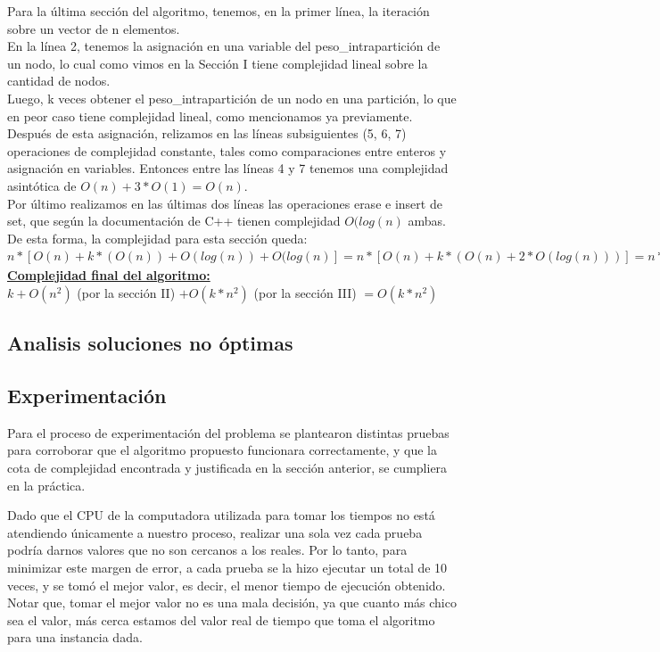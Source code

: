 \documentclass[10pt,a4paper]{article}
\begin{document}
Para la última sección del algoritmo, tenemos, en la primer línea, la iteración sobre un vector de n elementos.\\
En la línea 2, tenemos la asignación en una variable del peso\_intrapartición de un nodo, lo cual como vimos en la Sección I tiene complejidad lineal sobre la cantidad de nodos.\\
Luego, k veces obtener el peso\_intrapartición de un nodo en una partición, lo que en peor caso tiene complejidad lineal, como mencionamos ya previamente. Después de esta asignación, relizamos en las líneas subsiguientes (5, 6, 7) operaciones de complejidad constante, tales como comparaciones entre enteros y asignación en variables. Entonces entre las líneas 4 y 7 tenemos una complejidad asintótica de $O(n) + 3*O(1) = O(n)$.\\
Por último realizamos en las últimas dos líneas las operaciones erase e insert de set, que según la documentación de C++ tienen complejidad $O(log(n)$ ambas.\\
De esta forma, la complejidad para esta sección queda:\\
$n*[O(n)+k*(O(n))+O(log(n))+O(log(n)] = n*[O(n)+k*(O(n) + 2*O(log(n)))] = n*O(n) + k*n*O(n) = O(n^2) + O(k*n^2) = O(k*n^2)$\\

\textbf{\underline{Complejidad final del algoritmo:}}\\

$k +  O(n^2)$ (por la sección II) $+ O(k*n^2)$ (por la sección III) $=  O(k*n^2)$\\

\subsection{Analisis soluciones no óptimas}
\subsection{Experimentación}

Para el proceso de experimentación del problema se plantearon distintas pruebas para corroborar que el algoritmo propuesto funcionara correctamente, y que la cota de complejidad encontrada y justificada en la sección anterior, se cumpliera en la práctica.

\noindent Dado que el CPU de la computadora utilizada para tomar los tiempos no está atendiendo únicamente a nuestro proceso, realizar una sola vez cada prueba podría darnos valores que no son cercanos a los reales. Por lo tanto, para minimizar este margen de error, a cada prueba se la hizo ejecutar un total de 10 veces, y se tomó el mejor valor, es decir, el menor tiempo de ejecución obtenido. Notar que, tomar el mejor valor no es una mala decisión, ya que cuanto más chico sea el valor, más cerca estamos del valor real de tiempo que toma el algoritmo para una instancia dada.\\
\end{document}
